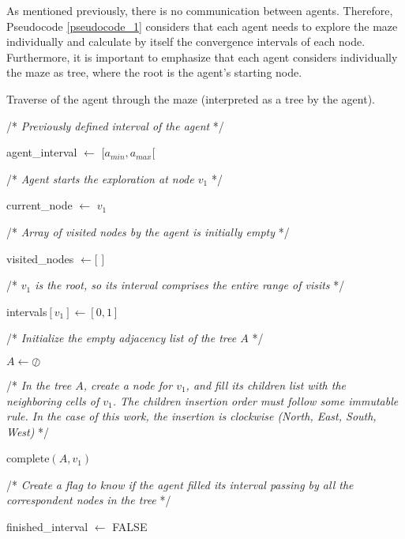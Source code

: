 As mentioned previously, there is no communication between agents. Therefore, Pseudocode \ref{pseudocode_1} considers that each agent needs to explore the maze individually and calculate by itself the convergence intervals of each node. Furthermore, it is important to emphasize that each agent considers individually the maze as tree, where the root is the agent's starting node.

\begin{algorithm}
\caption{Traverse of the agent through the maze (interpreted as a tree by the agent).}
\label{pseudocode_1}
\begin{algorithmic}%
\State /* \textit{Previously defined interval of the agent} */

\State agent\_interval $\gets$ $[a_{min},a_{max}[$

\State

\State /* \textit{Agent starts the exploration at node $v_{1}$} */

\State current\_node $\gets$ $v_{1}$

\State

\State /* \textit{Array of visited nodes by the agent is initially empty} */

\State visited\_nodes $\gets [$ $ ]$

\State

\State /* \textit{$v_{1}$ is the root, so its interval comprises the entire range of visits} */

\State intervals$[v_{1}] \gets [0,1]$

\State

\State /* \textit{Initialize the empty adjacency list of the tree $A$} */

\State $A \gets \oslash$

\State

\State /* \textit{In the tree $A$, create a node for $v_{1}$, and fill its children list with the neighboring cells of $v_{1}$. The children insertion order must follow some immutable rule. In the case of this work, the insertion is clockwise (North, East, South, West)} */

\State complete$(A, v_{1})$

\State

\State /* \textit{Create a flag to know if the agent filled its interval passing by all the correspondent nodes in the tree} */

\State finished\_interval $\gets$ FALSE

\State

\State


\end{algorithmic}
\end{algorithm}
